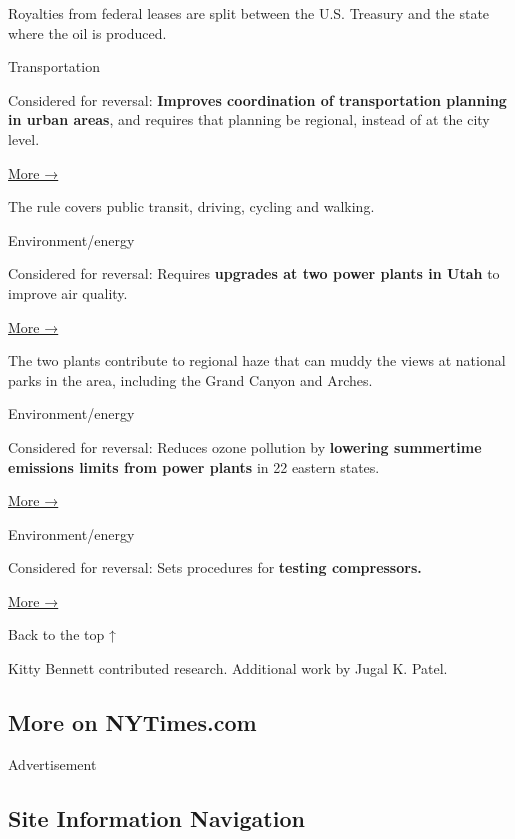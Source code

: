 Royalties from federal leases are split between the U.S. Treasury and
the state where the oil is produced.

Transportation

Considered for reversal: \textbf{Improves coordination of transportation
planning in urban areas}, and requires that planning be regional,
instead of at the city level.

\href{https://www.fhwa.dot.gov/planning/mpocoordination.cfm}{More →}

The rule covers public transit, driving, cycling and walking.

Environment/energy

Considered for reversal: Requires \textbf{upgrades at two power plants
in Utah} to improve air quality.

\href{https://www.federalregister.gov/documents/2016/07/05/2016-14645/approval-disapproval-and-promulgation-of-air-quality-implementation-plans-partial-approval-and}{More
→}

The two plants contribute to regional haze that can muddy the views at
national parks in the area, including the Grand Canyon and Arches.

Environment/energy

Considered for reversal: Reduces ozone pollution by \textbf{lowering
summertime emissions limits from power plants} in 22 eastern states.

\href{https://www.federalregister.gov/documents/2016/10/26/2016-22240/cross-state-air-pollution-rule-update-for-the-2008-ozone-naaqs}{More
→}

Environment/energy

Considered for reversal: Sets procedures for \textbf{testing
compressors.}

\href{https://www.federalregister.gov/documents/2017/01/04/2016-29427/energy-conservation-program-test-procedures-for-compressors}{More
→}

Back to the top ↑

Kitty Bennett contributed research. Additional work by Jugal K. Patel.

\hypertarget{more-on-nytimescom}{%
\subsection{More on NYTimes.com}\label{more-on-nytimescom}}

Advertisement

\hypertarget{site-information-navigation}{%
\subsection{Site Information
Navigation}\label{site-information-navigation}}

